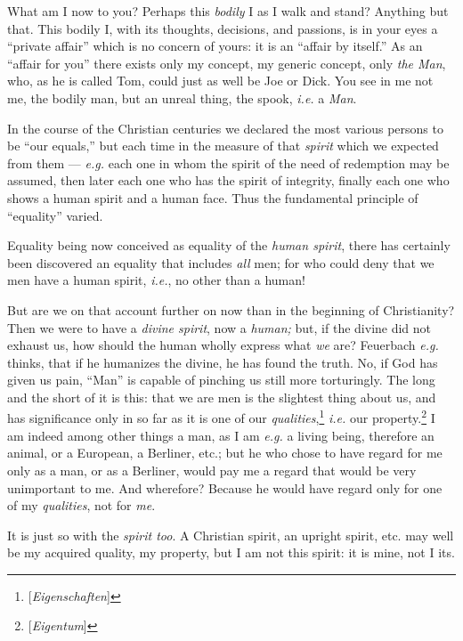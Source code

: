 What am I now to you? Perhaps this \textit{bodily} I as I walk and stand? 
Anything but that. This bodily I, with its thoughts, decisions, and passions, 
is in your eyes a ``private affair'' which is no concern of yours: it is an 
``affair by itself.'' As an ``affair for you'' there exists only my 
concept, my generic concept, only \textit{the Man}, who, as he is called Tom, 
could just as well be Joe or Dick. You see in me not me, the bodily man, but 
an unreal thing, the spook, \textit{i.e.} a \textit{Man}.

In the course of the Christian centuries we declared the most various persons 
to be ``our equals,'' but each time in the measure of that \textit{spirit} 
which we expected from them --- \textit{e.g.} each one in whom the spirit of 
the need of redemption may be assumed, then later each one who has the spirit 
of integrity, finally each one who shows a human spirit and a human face. Thus 
the fundamental principle of ``equality'' varied.

 Equality being now conceived as equality of the \textit{human spirit}, there 
has certainly been discovered an equality that includes \textit{all} men; for 
who could deny that we men have a human spirit, \textit{i.e.}, no other than 
a human!

But are we on that account further on now than in the beginning of 
Christianity? Then we were to have a \textit{divine spirit}, now a 
\textit{human;} but, if the divine did not exhaust us, how should the human 
wholly express what \textit{we} are? Feuerbach \textit{e.g.} thinks, that if 
he humanizes the divine, he has found the truth. No, if God has given us pain, 
``Man'' is capable of pinching us still more torturingly. The long and the 
short of it is this: that we are men is the slightest thing about us, and has 
significance only in so far as it is one of our 
\textit{qualities},\footnote{[\textit{Eigenschaften}]} \textit{i.e.} our 
property.\footnote{[\textit{Eigentum}]} I am indeed among other things a man, 
as I am \textit{e.g.} a living being, therefore an animal, or a European, a 
Berliner, etc.; but he who chose to have regard for me only as a man, or as a 
Berliner, would pay me a regard that would be very unimportant to me. And 
wherefore? Because he would have regard only for one of my \textit{qualities}, 
not for \textit{me}.

It is just so with the \textit{spirit too}. A Christian spirit, an upright 
spirit, etc. may well be my acquired quality, my property, but I am not this 
spirit: it is mine, not I its.


